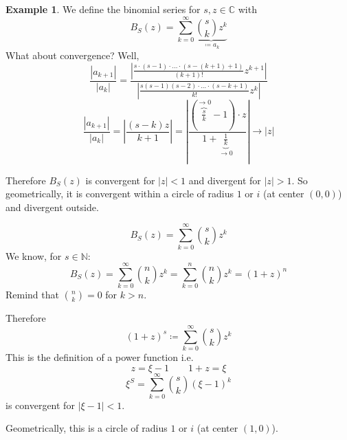 \documentclass[a4paper,landscape,twocolumn]{article}
\theoremstyle{definition}
\newtheorem{ex}{Example}
\newcommand\abs[1]{\left|#1\right|}
\begin{document}
\begin{ex}
  We define the binomial series for $s,z \in \mathbb C$ with
  \[ B_S(z) = \sum_{k=0}^\infty \underbrace{{s \choose k} z^k}_{\coloneqq a_k} \]
  What about convergence? Well,
  \[ \frac{\abs{a_{k+1}}}{\abs{a_k}} = \frac{\abs{\frac{s \cdot (s-1) \cdot \ldots \cdot (s-(k+1)+1)}{(k+1)!} z^{k+1}}}{\abs{\frac{s(s-1)(s-2)\cdot \ldots\cdot (s-k+1)}{k!} z^k}} \]
  \[ \frac{\abs{a_{k+1}}}{\abs{a_k}} = \abs{\frac{(s-k) z}{k+1}} = \abs{\frac{\left(\overbrace{\frac{s}{k}}^{\to 0} - 1\right) \cdot z}{1 + \underbrace{\frac1k}_{\to0}}} \to \abs{z} \]

  Therefore $B_S(z)$ is convergent for $\abs{z} < 1$ and divergent for $\abs{z} > 1$.
  So geometrically, it is convergent within a circle of radius $1$ or $i$ (at center $(0,0)$) and divergent outside.

  \[ B_S(z) = \sum_{k=0}^\infty {s \choose k} z^k \]
  We know, for $s \in \mathbb N$:
  \[ B_S(z) = \sum_{k=0}^\infty {n \choose k} z^k = \sum_{k=0}^n {n \choose k} z^k = (1 + z)^n \]
  Remind that ${n \choose k} = 0$ for $k > n$.

  Therefore
  \[ (1 + z)^s \coloneqq \sum_{k=0}^\infty {s \choose k} z^k \]
  This is the definition of a power function i.e.
  \[ z = \xi - 1 \qquad 1 + z = \xi \]
  \[ \xi^S = \sum_{k=0}^\infty {s \choose k} (\xi - 1)^k \]
  is convergent for $\abs{\xi - 1} < 1$.

  Geometrically, this is a circle of radius $1$ or $i$ (at center $(1,0)$).
\end{ex}
\end{document}
